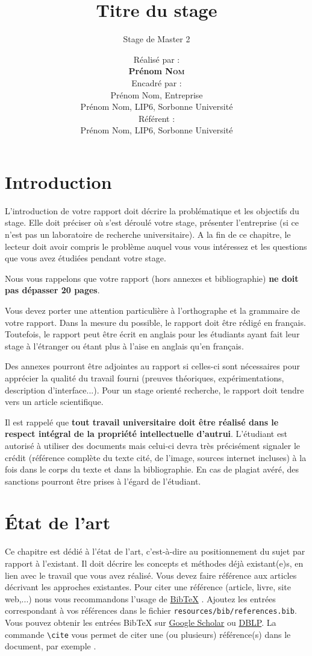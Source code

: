 \documentclass[a4paper, 12pt]{report}
\institute{Sorbonne Université}
\title{Titre du stage}
\subtitle{Stage de Master 2}
\author{ Réalisé par : \\[0.5cm]
		\textbf{Prénom \textsc{Nom}    }       \\[1cm]
		Encadré par :        \\
		Prénom Nom, Entreprise \\
		Prénom Nom, LIP6, Sorbonne Université \\[1cm]
		Référent  :        \\
		Prénom Nom, LIP6, Sorbonne Université
		 }
\begin{document}
    \maketitle
    \romantableofcontents

    \chapter{Introduction}

    L'introduction de votre rapport doit décrire la problématique et les objectifs du stage. 
    Elle doit  préciser où s'est déroulé votre stage, présenter l'entreprise (si ce n'est pas un laboratoire de recherche universitaire). A la fin de ce chapitre, le lecteur doit avoir compris le problème auquel vous vous intéressez et les questions que vous avez étudiées pendant votre stage. 
    
    Nous vous rappelons que votre rapport (hors annexes et bibliographie) \textbf{ne doit pas dépasser 20 pages}.
    
    Vous devez porter une attention particulière à l'orthographe et la grammaire de votre rapport. Dans la mesure du possible, le rapport doit être rédigé en français. Toutefois, le rapport peut être écrit en anglais pour les étudiants ayant fait leur stage à l'étranger ou étant plus à l'aise en anglais qu'en français. 
    
    Des annexes pourront être adjointes au rapport si celles-ci sont nécessaires pour apprécier la qualité du travail fourni (preuves théoriques, expérimentations, description d'interface...).
Pour un stage orienté recherche, le rapport doit tendre vers un article scientifique.
    
    
Il est rappelé que \textbf{tout travail universitaire doit être réalisé dans le respect intégral de la propriété
intellectuelle d'autrui}. L'étudiant est autorisé à utiliser des documents mais celui-ci devra très
précisément signaler le crédit (référence complète du texte cité, de l'image, sources internet incluses)
à la fois dans le corps du texte et dans la bibliographie. En cas de plagiat avéré, des sanctions
pourront être prises à l'égard de l'étudiant.

    \chapter{État de l'art}
    
    
   Ce chapitre est dédié à l'état de l'art, c'est-à-dire au positionnement du sujet par rapport à l'existant. Il doit décrire les concepts et méthodes déjà existant(e)s, en lien avec le travail que vous avez réalisé. Vous devez faire référence aux articles décrivant les approches existantes. Pour citer une référence (article, livre, site web,...) nous vous recommandons  l'usage de \href{https://fr.wikipedia.org/wiki/BibTeX}{BibTeX} . Ajoutez les entrées correspondant à vos références dans le fichier \verb+resources/bib/references.bib+. Vous pouvez obtenir les entrées BibTeX sur \href{https://scholar.google.com}{Google Scholar} ou \href{https://dblp.uni-trier.de}{DBLP}. La commande \verb+\cite+ vous permet de citer une (ou plusieurs) référence(s) dans le document, par exemple \cite{pakin2020comprehensive,RusselNorvig}. 
   
\end{document}
